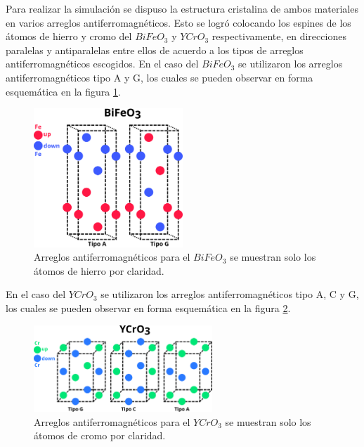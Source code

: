 
Para realizar la simulaci\'on se dispuso la estructura cristalina de ambos 
materiales en varios arreglos antiferromagn\'eticos. Esto se logr\'o colocando 
los espines de los \'atomos de hierro y cromo del $BiFeO_{3}$ y $YCrO_{3}$ 
respectivamente, en direcciones paralelas y antiparalelas entre ellos de 
acuerdo a los tipos de arreglos antiferromagn\'eticos escogidos. 
En el caso del $BiFeO_{3}$ se utilizaron los arreglos antiferromagn\'eticos 
tipo A y G, los cuales se pueden observar en forma esquem\'atica en la figura 
\ref{arreglos_BFO}.

\begin{figure}[H]
	\centering
	\includegraphics[width=0.5\textwidth]{contenido/calculos_computacionales/arreglos_antiferromagneticos/img_arreglos/BFO_unido.png}
	\caption[Arreglos antiferromagn\'eticos $BiFeO_{3}$]{Arreglos 
		antiferromagn\'eticos para el $BiFeO_{3}$ se muestran solo los \'atomos 
		de hierro por claridad.}
	\label{arreglos_BFO}
\end{figure}

\noindent En el caso del $YCrO_{3}$ se utilizaron los arreglos 
antiferromagn\'eticos tipo 
A, C y G, los cuales se pueden observar en forma esquem\'atica en la figura 
\ref{arreglos_YCO}.

\begin{figure}[H]
	\centering
	\includegraphics[width=0.6\textwidth]{contenido/calculos_computacionales/arreglos_antiferromagneticos/img_arreglos/YCO_unido.png}
	\caption[Arreglos antiferromagn\'eticos $BiFeO_{3}$]{Arreglos 
		antiferromagn\'eticos para el $YCrO_{3}$ se muestran solo los \'atomos 
		de cromo por claridad.}
	\label{arreglos_YCO}
\end{figure}